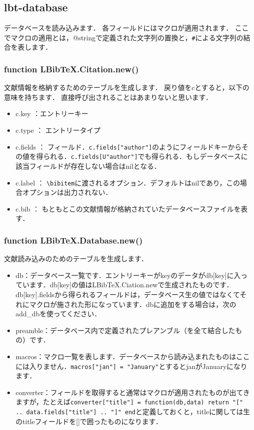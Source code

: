 \documentclass[a4paper]{ltjsarticle}
\begin{document}
\subsection{lbt-database}\label{subsec:lbt-database}
データベースを読み込みます．
各フィールドにはマクロが適用されます．
ここでマクロの適用とは，@stringで定義された文字列の置換と，\verb|#|による文字列の結合を表します．
\subsubsection{function LBibTeX.Citation.new()}
文献情報を格納するためのテーブルを生成します．
戻り値をcとすると，以下の意味を持ちます．
直接呼び出されることはあまりないと思います．
\begin{itemize}
\item c.key ：エントリーキー
\item c.type ： エントリータイプ
\item c.fields ： フィールド．\verb|c.fields["author"]|のようにフィールドキーからその値を得られる．\verb|c.fields[U"author"]|でも得られる．もしデータベースに該当フィールドが存在しない場合はnilとなる．
\item c.label ： \verb|\bibitem|に渡されるオプション．デフォルトはnilであり，この場合オプションは出力されない．
\item c.bib ： もともとこの文献情報が格納されていたデータベースファイルを表す．
\end{itemize}

\subsubsection{function LBibTeX.Database.new()}
文献読み込みのためのテーブルを生成します．
\begin{itemize}
\item db：データベース一覧です．エントリーキーがkeyのデータがdb[key]に入っています．db[key]の値はLBibTeX.Ciation.newで生成されたものです．db[key].fieldsから得られるフィールドは，データベース生の値ではなくてそれにマクロが施された形になっています．dbに追加をする場合は，次のadd\_dbを使ってください．
\item preamble：データベース内で定義されたプレアンブル（を全て結合したもの）です．
\item macros：マクロ一覧を表します．データベースから読み込まれたものはここには入りません．\verb|macros["jan"] = "January"|とするとjanがJanuaryになります．
\item converter：フィールドを取得すると通常はマクロが適用されたものが出てきますが，たとえば\verb|converter["title"] = function(db,data) return "[" .. data.fields["title"] .. "]" end|と定義しておくと，titleに関しては生のtitleフィールドを[]で囲ったものになります．
\end{itemize}
\end{document}

